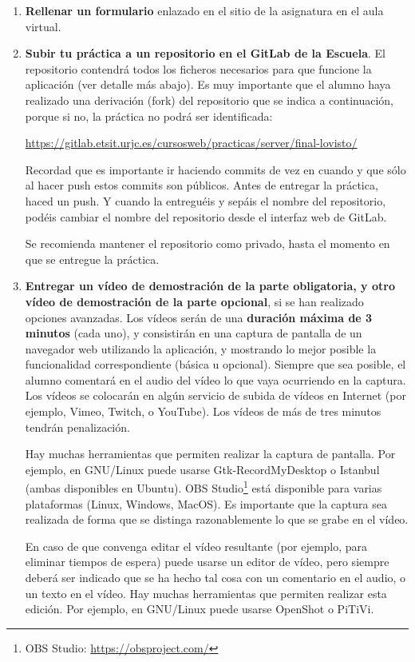 \begin{enumerate}

  \item {\bf Rellenar un formulario} enlazado en el sitio de la asignatura en el aula virtual.
  
  \item {\bf Subir tu práctica a un repositorio en el GitLab de la Escuela}. El repositorio contendrá todos los ficheros necesarios para que funcione la aplicación (ver detalle más abajo). Es muy importante que el alumno haya realizado una derivación (fork) del repositorio que se indica a continuación, porque si no, la práctica no podrá ser identificada: 

\url{https://gitlab.etsit.urjc.es/cursosweb/practicas/server/final-lovisto/}

Recordad que es importante ir haciendo commits de vez en cuando y que sólo al hacer push estos commits son públicos. Antes de entregar la práctica, haced un push. Y cuando la entreguéis y sepáis el nombre del repositorio, podéis cambiar el nombre del repositorio desde el interfaz web de GitLab. 

Se recomienda mantener el repositorio como privado, hasta el momento en que se entregue la práctica.

 \item {\bf Entregar un vídeo de demostración de la parte obligatoria, y otro vídeo de demostración de la parte opcional}, si se han realizado opciones avanzadas. Los vídeos serán de una {\bf duración máxima de 3 minutos} (cada uno), y consistirán en una captura de pantalla de un navegador web utilizando la aplicación, y mostrando lo mejor posible la funcionalidad correspondiente (básica u opcional). Siempre que sea posible, el alumno comentará en el audio del vídeo lo que vaya ocurriendo en la captura. Los vídeos se colocarán en algún servicio de subida de vídeos en Internet (por ejemplo, Vimeo, Twitch, o YouTube). Los vídeos de más de tres minutos tendrán penalización.

Hay muchas herramientas que permiten realizar la captura de pantalla. Por ejemplo, en GNU/Linux puede usarse Gtk-RecordMyDesktop o Istanbul (ambas disponibles en Ubuntu). OBS Studio\footnote{OBS Studio: \url{https://obsproject.com/}} está disponible para varias plataformas (Linux, Windows, MacOS). Es importante que la captura sea realizada de forma que se distinga razonablemente lo que se grabe en el vídeo.

En caso de que convenga editar el vídeo resultante (por ejemplo, para eliminar tiempos de espera) puede usarse un editor de vídeo, pero siempre deberá ser indicado que se ha hecho tal cosa con un comentario en el audio, o un texto en el vídeo. Hay muchas herramientas que permiten realizar esta edición. Por ejemplo, en GNU/Linux puede usarse OpenShot o PiTiVi.

\end{enumerate}

